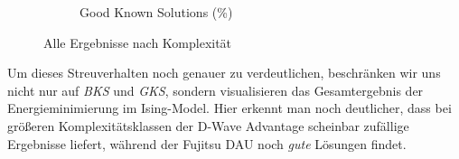 \begin{figure}[H]
\begin{subfigure}[b]{0.475\textwidth}
            \caption[]%
            {{\small Good Known Solutions (\%)}}    
            \label{fig:GKS}
        \end{subfigure}
        \caption[ Ergebnisse nach Komplexität ]
         {\small Alle Ergebnisse nach Komplexität} 
        \label{fig:A}
    \end{figure}

Um  dieses Streuverhalten noch genauer zu verdeutlichen, beschränken wir uns nicht nur auf \textit{BKS}  und \textit{GKS},  sondern visualisieren das Gesamtergebnis der Energieminimierung im Ising-Model. Hier erkennt man noch deutlicher, dass bei größeren Komplexitätsklassen der D-Wave Advantage scheinbar zufällige Ergebnisse liefert, während der Fujitsu DAU noch \textit{gute} Lösungen findet.\\


